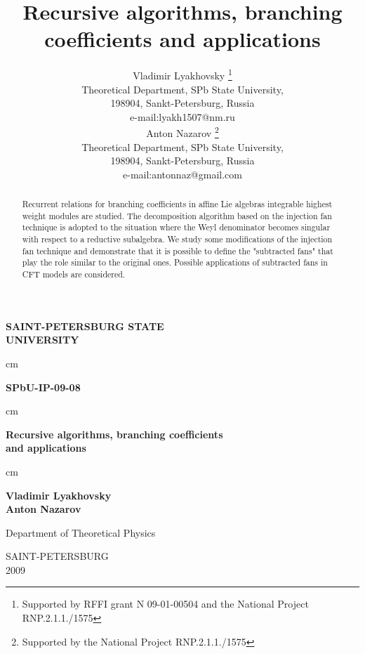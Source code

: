 \documentclass[a4paper,12pt]{article}
\theoremstyle{definition} \newtheorem{Def}{Definition}
\begin{document}
\thispagestyle{empty}

\begin{center}
{\Large \bf SAINT-PETERSBURG STATE\\[0.5cm] UNIVERSITY}
\end{center}
 cm
\begin{flushright}
{\large \bf SPbU-IP-09-08}
\end{flushright}
\hfill {}
 cm
\begin{center}
{\Huge \bf Recursive algorithms, branching coefficients \\ and applications\\[0.5cm]
}
\end{center}
 cm
\begin{center}
{\Large \bf
Vladimir Lyakhovsky\\[2mm]
Anton Nazarov}
\end{center}
\vfill
\begin{center}
{\large Department of Theoretical Physics\\
}
\end{center}
\vfill
\begin{center}
SAINT-PETERSBURG \\
2009
\end{center}

\newpage

\title{\textbf{{\Large {Recursive algorithms, branching coefficients and applications}}}}
\author{Vladimir Lyakhovsky \thanks{ Supported by
 RFFI grant N 09-01-00504 and the National Project RNP.2.1.1./1575 }\\
Theoretical Department, SPb State University,\\
198904, Sankt-Petersburg, Russia \\
e-mail:lyakh1507@nm.ru \\
[5mm] Anton Nazarov \thanks{ Supported by
the National Project RNP.2.1.1./1575 }\\
Theoretical Department, SPb State University,\\
198904, Sankt-Petersburg, Russia \\
e-mail:antonnaz@gmail.com
}

\begin{abstract}
  Recurrent relations for branching coefficients in affine Lie algebras integrable highest weight modules are studied. The decomposition algorithm based on the injection fan technique is adopted to the situation where the Weyl denominator becomes singular with respect to a reductive subalgebra. We study some modifications of the injection fan technique and demonstrate that it is possible to define the "subtracted fans" that play the role similar to the original ones. Possible applications of subtracted fans in CFT models are considered.
\end{abstract}
\end{document}
